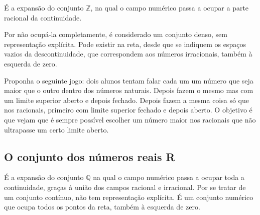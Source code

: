 É a expansão do conjunto $\mathbb{Z}$, na qual o campo numérico passa a ocupar a parte racional da continuidade.

Por não ocupá-la completamente, é considerado um conjunto denso, sem representação explícita. 
Pode existir na reta, desde que se indiquem os espaços vazios da descontinuidade, que correspondem aos números irracionais, também à esquerda de zero.

Proponha o seguinte jogo: dois alunos tentam falar cada um um número que seja maior que o outro dentro dos números naturais. Depois fazem o mesmo mas com um limite superior aberto e depois fechado. Depois fazem a mesma coisa só que nos racionais, primeiro com limite superior fechado e depois aberto. O objetivo é que vejam que é sempre possível escolher um número maior nos racionais que não ultrapasse um certo limite aberto. 
 
\subsection{O conjunto dos números reais R}

É a expansão do conjunto $\mathbb{Q}$ na qual o campo numérico passa a ocupar toda a continuidade, graças à união dos campos racional e irracional. Por se tratar de um conjunto contínuo, não tem representação explícita. É um conjunto numérico que ocupa todos os pontos da reta, também à esquerda de zero.

